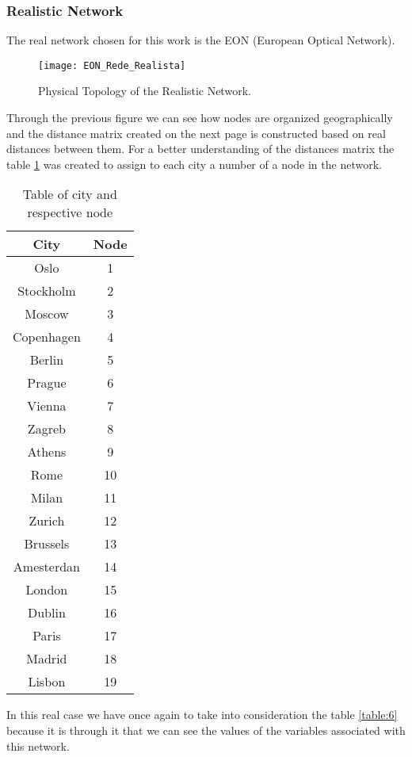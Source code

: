 \subsubsection{Realistic Network}
The real network chosen for this work is the EON (European Optical Network).

\begin{figure}[h!]
\centering
\texttt{[image: EON\_Rede\_Realista]}
\caption{Physical Topology of the Realistic Network.}
\end{figure}

Through the previous figure we can see how nodes are organized geographically and the distance matrix created on the next page is constructed based on real distances between them.
For a better understanding of the distances matrix the table \ref{city_nodes3} was created to assign to each city a number of a node in the network.

\begin{table}[h!]
\centering
\begin{tabular}{|| c | c ||}
 \hline
 City & Node \\
 \hline\hline
 Oslo & 1 \\
 Stockholm & 2 \\
 Moscow & 3 \\
 Copenhagen & 4 \\
 Berlin & 5 \\
 Prague & 6 \\
 Vienna & 7 \\
 Zagreb & 8 \\
 Athens & 9 \\
 Rome & 10 \\
 Milan & 11 \\
 Zurich & 12 \\
 Brussels & 13 \\
 Amesterdan & 14 \\
 London & 15 \\
 Dublin & 16 \\
 Paris & 17 \\
 Madrid & 18 \\
 Lisbon & 19 \\
 \hline
\end{tabular}
\caption{Table of city and respective node}
\label{city_nodes3}
\end{table}

In this real case we have once again to take into consideration the table \ref{table:6} because it is through it that we can see the values of the variables associated with this network.

